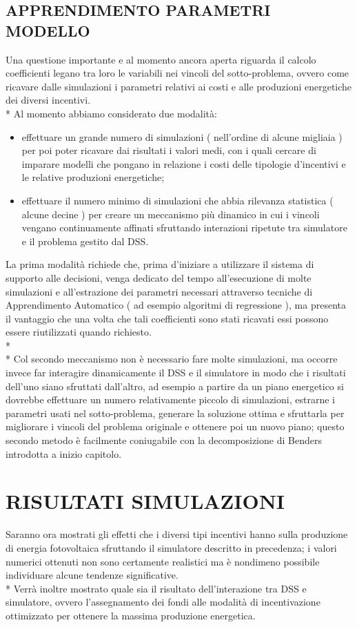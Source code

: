 \documentclass[12pt,a4paper,openright,twoside]{report}
\begin{document}
\subsection{APPRENDIMENTO PARAMETRI MODELLO}
Una questione importante e al momento ancora aperta riguarda il calcolo coefficienti legano tra loro le variabili nei vincoli del sotto-problema, ovvero come ricavare dalle simulazioni i parametri relativi ai costi e alle produzioni energetiche dei diversi incentivi. \\*
Al momento abbiamo considerato due modalità: 
\begin{itemize}
	\item effettuare un grande numero di simulazioni ( nell'ordine di alcune migliaia ) per poi poter ricavare dai risultati i valori medi, con i quali cercare di imparare modelli che pongano in relazione i costi delle tipologie d'incentivi e le relative produzioni energetiche;
	\item effettuare il numero minimo di simulazioni che abbia rilevanza statistica ( alcune decine ) per creare un meccanismo più dinamico in cui i vincoli vengano continuamente affinati sfruttando interazioni ripetute tra simulatore e il problema gestito dal DSS.
\end{itemize}
La prima modalità richiede che, prima d'iniziare a utilizzare il sistema di supporto alle decisioni, venga dedicato del tempo all'esecuzione di molte simulazioni e all'estrazione dei parametri necessari attraverso tecniche di Apprendimento Automatico ( ad esempio algoritmi di regressione ), ma presenta il vantaggio che una volta che tali coefficienti sono stati ricavati essi possono essere riutilizzati quando richiesto.
\\* \\*
Col secondo meccanismo non è necessario fare molte simulazioni, ma occorre invece far interagire dinamicamente il DSS e il simulatore in modo che i risultati dell'uno siano sfruttati dall'altro, ad esempio a partire da un piano energetico si dovrebbe effettuare un numero relativamente piccolo di simulazioni, estrarne i parametri usati nel sotto-problema, generare la soluzione ottima e sfruttarla per migliorare i vincoli del problema originale e ottenere poi un nuovo piano; questo secondo metodo è facilmente coniugabile con la decomposizione di Benders introdotta a inizio capitolo.

\section[RISULTATI]{RISULTATI SIMULAZIONI}
Saranno ora mostrati gli effetti che i diversi tipi incentivi hanno sulla produzione di energia fotovoltaica sfruttando il simulatore descritto in precedenza; i valori numerici ottenuti non sono certamente realistici ma è nondimeno possibile individuare alcune tendenze significative.\\*
Verrà inoltre mostrato quale sia il risultato dell'interazione tra DSS e simulatore, ovvero l'assegnamento dei fondi alle modalità di incentivazione ottimizzato per ottenere la massima produzione energetica.
\end{document}
